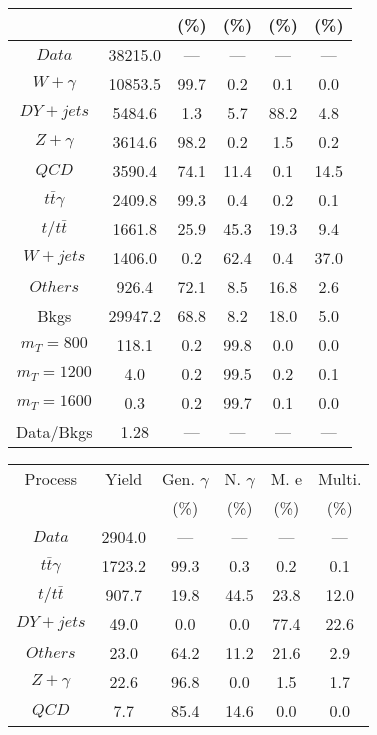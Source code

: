 \begin{figure}
\begin{minipage}[c]{0.32\textwidth}
{\begin{tabular}{cccccc}
 &  & (\%) & (\%) & (\%) & (\%)  \\
\hline
                                                                      $ Data $ &  38215.0 &  --- &  --- &  --- &  ---\\
$ W+\gamma $ &  10853.5 &  99.7 &  0.2 &  0.1 &  0.0\\
$ DY+jets $ &  5484.6 &  1.3 &  5.7 &  88.2 &  4.8\\
$ Z+\gamma $ &  3614.6 &  98.2 &  0.2 &  1.5 &  0.2\\
$ QCD $ &  3590.4 &  74.1 &  11.4 &  0.1 &  14.5\\
$ t\bar{t}\gamma $ &  2409.8 &  99.3 &  0.4 &  0.2 &  0.1\\
$ t/t\bar{t} $ &  1661.8 &  25.9 &  45.3 &  19.3 &  9.4\\
$ W+jets $ &  1406.0 &  0.2 &  62.4 &  0.4 &  37.0\\
$ Others $ &  926.4 &  72.1 &  8.5 &  16.8 &  2.6\\
Bkgs &  29947.2 &  68.8 &  8.2 &  18.0 &  5.0\\
$ m_{T} = 800 $ &  118.1 &  0.2 &  99.8 &  0.0 &  0.0\\
$ m_{T} = 1200 $ &  4.0 &  0.2 &  99.5 &  0.2 &  0.1\\
$ m_{T} = 1600 $ &  0.3 &  0.2 &  99.7 &  0.1 &  0.0\\
Data/Bkgs &  1.28 &  --- &  --- &  --- &  ---\\
\hline
\end{tabular}
}
\end{minipage}
\begin{minipage}[c]{0.32\textwidth}
\centering
\tiny{
\begin{tabular}{cccccc}
\hline
Process & Yield & Gen. $\gamma$ & N. $\gamma$ & M. e & Multi. \\
 &  & (\%) & (\%) & (\%) & (\%)  \\
\hline
                                                                      $ Data $ &  2904.0 &  --- &  --- &  --- &  ---\\
$ t\bar{t}\gamma $ &  1723.2 &  99.3 &  0.3 &  0.2 &  0.1\\
$ t/t\bar{t} $ &  907.7 &  19.8 &  44.5 &  23.8 &  12.0\\
$ DY+jets $ &  49.0 &  0.0 &  0.0 &  77.4 &  22.6\\
$ Others $ &  23.0 &  64.2 &  11.2 &  21.6 &  2.9\\
$ Z+\gamma $ &  22.6 &  96.8 &  0.0 &  1.5 &  1.7\\
$ QCD $ &  7.7 &  85.4 &  14.6 &  0.0 &  0.0\\

\end{tabular}}
\end{minipage}
\end{figure}

